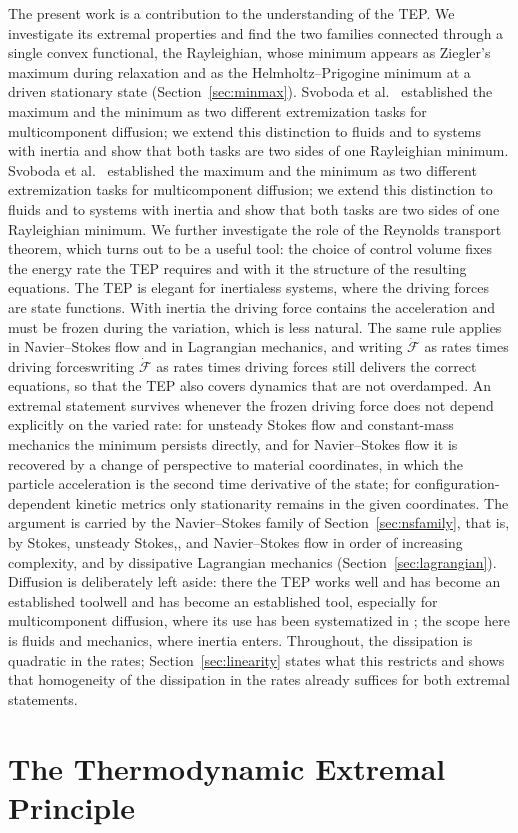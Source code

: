 \documentclass[12pt]{article}
\newif\ifhighlight \highlightfalse
\newif\ifhighlightfirst \highlightfirstfalse
\DeclareRobustCommand{\chg}[1]{\ifhighlight\ifhighlightfirst\textcolor{revised}{#1}\else#1\fi\else#1\fi}
\DeclareRobustCommand{\chgb}[1]{\ifhighlight\textcolor{revisedb}{#1}\else#1\fi}
\begin{document}
The present work is a contribution to the understanding of the TEP. We investigate its extremal properties and find the two families connected through a single convex functional, the Rayleighian, whose minimum \chgb{appears} as Ziegler's maximum during relaxation and as the Helmholtz--Prigogine minimum at a driven stationary state (Section~\ref{sec:minmax})\chg{. Svoboda et al.\ \cite{svoboda2023note} established the maximum and the minimum as two different extremization tasks for multicomponent diffusion; we extend this distinction to fluids and to systems with inertia and show that both tasks are \chgb{two sides} of one Rayleighian minimum}. We further investigate the role of the Reynolds transport theorem, which turns out to be a useful tool: the choice of control volume fixes the energy rate the TEP \chgb{requires and} with it the structure of the resulting equations. The TEP is elegant for inertialess systems, where the driving forces are state functions. With inertia the driving force contains the acceleration and must be frozen during the variation, which is less natural. The same rule applies in Navier--Stokes flow and in Lagrangian mechanics, and \chg{writing $\dot{\mathcal{F}}$ as rates times driving forces} still delivers the correct equations, so that the TEP also covers dynamics that are not overdamped. An extremal statement survives whenever the frozen driving force does not depend explicitly on the varied rate: for unsteady Stokes flow and constant-mass mechanics the minimum persists directly, and for Navier--Stokes flow it is recovered by a change of perspective to material coordinates, in which the particle acceleration is the second time derivative of the state; for configuration-dependent kinetic metrics only stationarity remains in the given coordinates. The argument is carried by the Navier--Stokes family of Section~\ref{sec:nsfamily}, that is, by Stokes, unsteady Stokes\chg{,} and Navier--Stokes flow in order of increasing complexity, and by dissipative Lagrangian mechanics (Section~\ref{sec:lagrangian}). Diffusion is deliberately left aside: there the TEP works \chg{well and has become an established tool}, especially for multicomponent diffusion, where its use has been systematized in \cite{flachberger2024}; the scope here is fluids and mechanics, where inertia enters. Throughout, the dissipation is quadratic in the rates; Section~\ref{sec:linearity} states what this restricts and shows that homogeneity \chgb{of the dissipation in the rates already suffices for both extremal statements}.


\section{The Thermodynamic Extremal Principle}
\label{sec:tep}
\end{document}
